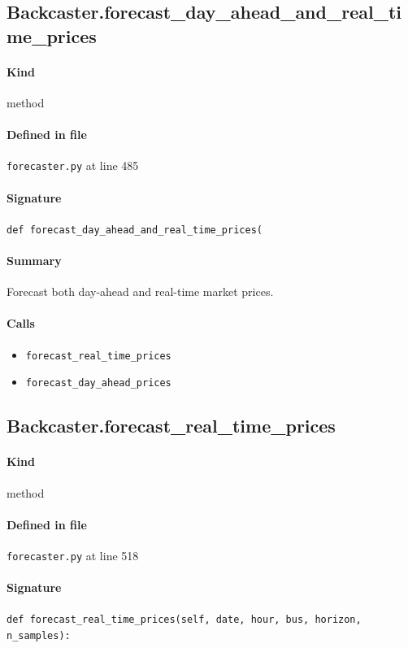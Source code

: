 \documentclass[11pt]{report}
\begin{document}
\subsection{Backcaster.forecast\_day\_ahead\_and\_real\_time\_prices}
\label{def:forecaster.py:Backcaster.forecast_day_ahead_and_real_time_prices:L485}
\paragraph{Kind} method
\paragraph{Defined in file} \texttt{forecaster.py} at line 485
\paragraph{Signature} \texttt{def forecast\_day\_ahead\_and\_real\_time\_prices(}
\paragraph{Summary} Forecast both day-ahead and real-time market prices.
\paragraph{Calls}
\begin{itemize}[leftmargin=*]
  \item \texttt{forecast\_real\_time\_prices}
  \item \texttt{forecast\_day\_ahead\_prices}
\end{itemize}
\subsection{Backcaster.forecast\_real\_time\_prices}
\label{def:forecaster.py:Backcaster.forecast_real_time_prices:L518}
\paragraph{Kind} method
\paragraph{Defined in file} \texttt{forecaster.py} at line 518
\paragraph{Signature} \texttt{def forecast\_real\_time\_prices(self, date, hour, bus, horizon, n\_samples):}
\end{document}
